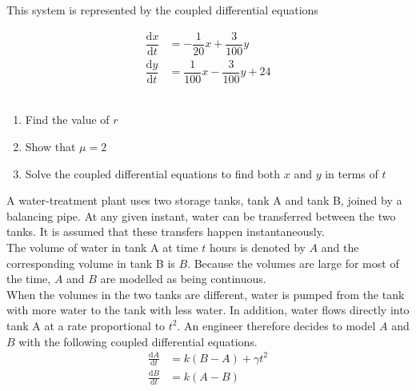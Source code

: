 \documentclass[leqno]{article}
\begin{document}
\begin{enumerate}[
  label=\textbf{\arabic*.},
  leftmargin=*,
  topsep=0pt,
  partopsep=0pt,
  parsep=0pt
]
This system is represented by the coupled differential equations

\begin{align*}
\dfrac{\mathrm{d}x}{\mathrm{d}t} & =  -\dfrac{1}{20}x+\dfrac{3}{100}y\\[6pt]
\dfrac{\mathrm{d}y}{\mathrm{d}t} & =  \dfrac{1}{100}x-\dfrac{3}{100}y + 24
\end{align*}
\\
\begin{enumerate}[label=\textbf{(\alph*)}]
  \item Find the value of $r$  \\
  \item Show that $\mu=2$  \\
  \item Solve the coupled differential equations to find both $x$ and $y$ in terms of $t$  \\
\end{enumerate}

\newpage

\questionitem

A water-treatment plant uses two storage tanks, tank A and tank B, joined by a balancing pipe. At any given instant, water can be transferred between the two tanks. It is assumed that these transfers happen instantaneously. \\

The volume of water in tank A at time $t$ hours is denoted by $A$ and the corresponding volume in tank B is $B$. Because the volumes are large for most of the time, $A$ and $B$ are modelled as being continuous. \\

When the volumes in the two tanks are different, water is pumped from the tank with more water to the tank with less water. In addition, water flows directly into tank A at a rate proportional to $t^2$. An engineer therefore decides to model $A$ and $B$ with the following coupled differential equations. \\

\begin{align*}
\frac{\mathrm{d}A}{\mathrm{d}t}&=k(B-A)+\gamma t^2 \\
\frac{\mathrm{d}B}{\mathrm{d}t}&=k(A-B)
\end{align*} \\


\end{enumerate}
\end{document}
